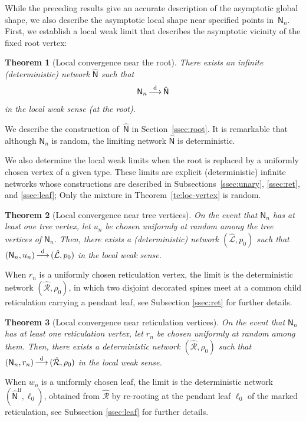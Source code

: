 \documentclass[english,11pt]{smfart}
\newcommand{\convdis}{\,{\buildrel \mathrm{d} \over \longrightarrow}\,}
\newcommand{\cL}{\mathcal{L}}
\newcommand{\cR}{\mathcal{R}}
\newcommand{\mN}{\mathsf{N}}
\newtheorem{theorem}{Theorem}[section]
\numberwithin{equation}{section}
\begin{document}
While the preceding results give an accurate description of the asymptotic global shape, we also describe the asymptotic local shape near specified points in~$\mN_n$. First, we establish a local weak limit that describes the asymptotic vicinity of the fixed root vertex:
\begin{theorem}[Local convergence near the root]\label{te:local_limit}
	There exists an infinite (deterministic) network $\hat{\mN}$ such that
	\[
		\mN_n \convdis \hat{\mN}
	\]
	in the local weak sense (at the root).
\end{theorem}

We describe the construction of~$\hat{\mN}$ in Section~\ref{ssec:root}. It is remarkable that although $\mN_n$ is random, the limiting network $\hat{\mN}$ is deterministic.
\smallskip

We also determine the local weak limits when the root is replaced by a
uniformly chosen vertex of a given type. These limits are explicit (deterministic) infinite networks whose constructions are described in
Subsections~\ref{ssec:unary}, \ref{ssec:ret}, and \ref{ssec:leaf}; Only the mixture in Theorem~\ref{te:loc-vertex} is random.


\begin{theorem}[Local convergence near tree vertices]\label{te:loc-unary}
On the event that $\mN_n$ has at least one tree vertex, let $u_n$ be
chosen uniformly at random among the tree vertices of $\mN_n$.
Then, there exists a (deterministic) network $(\hat{\cL},p_0)$ such that $(\mN_n,u_n)\convdis(\hat{\cL},p_0)$ in the local weak sense.
\end{theorem}

When $r_n$ is a uniformly chosen reticulation vertex, the limit is the deterministic network $(\hat{\cR},\rho_0)$, in which two disjoint decorated
spines meet at a common child reticulation carrying a pendant leaf, see Subsection \ref{ssec:ret} for further details. 


\begin{theorem}[Local convergence near reticulation vertices]\label{te:loc-ret}
On the event that $\mN_n$ has at least one reticulation vertex, let $r_n$ be
chosen uniformly at random among them. Then, there exists a deterministic network $(\hat{\cR},\rho_0)$ such that $(\mN_n,r_n)\convdis(\hat{\cR},\rho_0)$
in the local weak sense.
\end{theorem}

When $w_n$ is a uniformly chosen leaf, the limit is the deterministic network
$(\hat{\mN}^{\mathrm{lf}},\ell_0)$, obtained from $\hat{\cR}$ by re-rooting
at the pendant leaf $\ell_0$ of the marked reticulation, see Subsection \ref{ssec:leaf} for further details.
\end{document}
